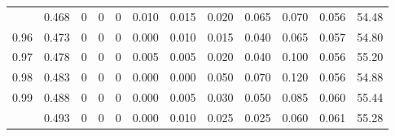 \documentclass[
]{article}
\begin{document}
\begin{table}
{\begin{tabular}[t]{rrrrrrrrrrrr}
\addlinespace
0.95 & 0.468 & 0 & 0 & 0 & 0.010 & 0.015 & 0.020 & 0.065 & 0.070 & 0.056 & 54.48\\
0.96 & 0.473 & 0 & 0 & 0 & 0.000 & 0.010 & 0.015 & 0.040 & 0.065 & 0.057 & 54.80\\
0.97 & 0.478 & 0 & 0 & 0 & 0.005 & 0.005 & 0.020 & 0.040 & 0.100 & 0.056 & 55.20\\
0.98 & 0.483 & 0 & 0 & 0 & 0.000 & 0.000 & 0.050 & 0.070 & 0.120 & 0.056 & 54.88\\
0.99 & 0.488 & 0 & 0 & 0 & 0.000 & 0.005 & 0.030 & 0.050 & 0.085 & 0.060 & 55.44\\
\addlinespace
1.00 & 0.493 & 0 & 0 & 0 & 0.000 & 0.010 & 0.025 & 0.025 & 0.060 & 0.061 & 55.28\\
\bottomrule
\end{tabular}

}

\end{table}%
\end{document}
